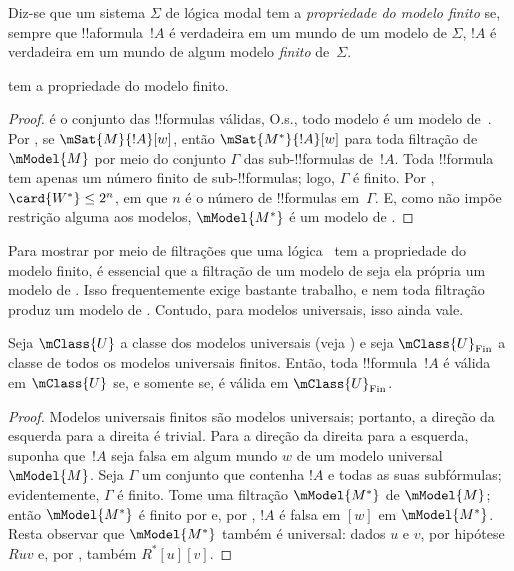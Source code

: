 \documentclass[../../../include/open-logic-section]{subfiles}
\begin{document}


\begin{defn}
  Diz-se que um sistema $\Sigma$ de lógica modal tem a \emph{propriedade
    do modelo finito} se, sempre que !!a{formula}~$!A$ é verdadeira em um
  mundo de um modelo de $\Sigma$, $!A$ é verdadeira em um mundo de algum
  modelo \emph{finito} de~$\Sigma$.
\end{defn}

\begin{prop}
   tem a propriedade do modelo finito.
\end{prop}

\begin{proof}
   é o conjunto das !!{formula}s válidas, O.s.\@, todo modelo é
  um modelo de~. Por , se
  $\mSat{M}{!A}[w]$, então $\mSat{M^*}{!A}[w]$ para toda filtração
  de~$\mModel{M}$ por meio do conjunto $\Gamma$ das sub-!!{formula}s
  de~$!A$. Toda !!{formula} tem apenas um número finito de
  sub-!!{formula}s; logo, $\Gamma$ é finito. Por
  , $\card{W^*} \le 2^n$, em que $n$
  é o número de !!{formula}s em~$\Gamma$. E, como  não impõe
  restrição alguma aos modelos, $\mModel{M^*}$ é um modelo de .
\end{proof}

Para mostrar por meio de filtrações que uma lógica~ tem a
propriedade do modelo finito, é essencial que a filtração de um modelo
de  seja ela própria um modelo de . Isso frequentemente
exige bastante trabalho, e nem toda filtração produz um modelo de
. Contudo, para modelos universais, isso ainda vale.

\begin{prop}
  Seja $\mClass{U}$ a classe dos modelos universais (veja
  ) e seja $\mClass{U}_\mathrm{Fin}$ a
  classe de todos os modelos universais finitos. Então, toda
  !!{formula}~$!A$ é válida em $\mClass{U}$ se, e somente se, é válida em
  $\mClass{U}_\mathrm{Fin}$.
\end{prop}

\begin{proof}
  Modelos universais finitos são modelos universais; portanto, a direção
  da esquerda para a direita é trivial. Para a direção da direita para a
  esquerda, suponha que~$!A$ seja falsa em algum mundo $w$ de um modelo
  universal $\mModel{M}$. Seja $\Gamma$ um conjunto que contenha $!A$ e
  todas as suas subfórmulas; evidentemente, $\Gamma$ é finito. Tome uma
  filtração $\mModel{M^*}$ de $\mModel{M}$; então $\mModel{M^*}$ é finito
  por  e, por
  , $!A$ é falsa em $[w]$ em
  $\mModel{M^*}$. Resta observar que $\mModel{M^*}$ também é universal:
  dados $u$ e $v$, por hipótese $Ruv$ e, por
  , também
  $R^*[u][v]$.
\end{proof}
\end{document}
